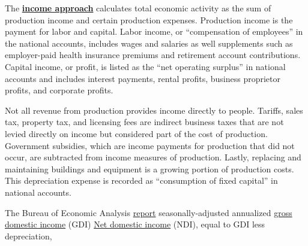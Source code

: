 \documentclass{report}
\begin{document}
\begin{minipage}{0.76\textwidth}
\small The \textbf{\href{https://www.bea.gov/help/glossary/income-approach}{income approach}} calculates total economic activity as the sum of production income and certain production expenses. Production income is the payment for labor and capital. Labor income, or ``compensation of employees'' in the national accounts, includes wages and salaries as well supplements such as employer-paid health insurance premiums and retirement account contributions. Capital income, or profit, is listed as the ``net operating surplus'' in national accounts and includes interest payments, rental profits, business proprietor profits, and corporate profits.

Not all revenue from production provides income directly to people. Tariffs, sales tax, property tax, and licensing fees are indirect business taxes that are not levied directly on income but considered part of the cost of production. Government subsidies, which are income payments for production that did not occur, are subtracted from income measures of production. Lastly, replacing and maintaining buildings and equipment is a growing portion of production costs. This depreciation expense is recorded as ``consumption of fixed capital'' in national accounts.

The Bureau of Economic Analysis \href{https://www.bea.gov/data/gdp/gross-domestic-product}{report} seasonally-adjusted annualized \href{https://www.bea.gov/help/glossary/gross-domestic-income-gdi}{gross domestic income} (GDI)  \href{https://www.bea.gov/help/glossary/net-domestic-income-ndi}{Net domestic income} (NDI), equal to GDI less depreciation, 
\end{minipage}
\vspace{1mm}
\end{document}
